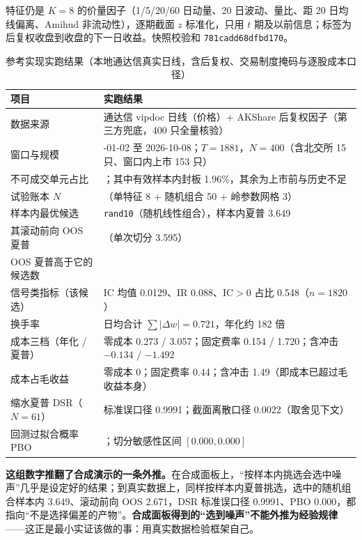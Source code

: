 特征仍是 $K=8$ 的价量因子（1/5/20/60 日动量、20 日波动、量比、距 20 日均线偏离、Amihud 非流动性），逐期截面 $z$ 标准化，只用 $t$ 期及以前信息；标签为后复权收盘到收盘的下一日收益。快照校验和 \texttt{781cadd68dfbd170}。

\begin{table}[htbp]
\centering
\caption{参考实现实跑结果（本地通达信真实日线，含后复权、交易制度掩码与逐股成本口径）}
\label{tab:runreal}
\begin{tabular}{@{}>{\raggedright\arraybackslash}p{5.6cm}>{\raggedright\arraybackslash}p{8.8cm}@{}}
\toprule
项目 & 实跑结果 \\
\midrule
数据来源 & 通达信 vipdoc 日线（价格）+ AKShare 后复权因子（第三方兜底，400 只全量核验） \\
窗口与规模 & 2019-01-02 至 2026-10-08；$T=1881$，$N=400$（含北交所 15 只、窗口内上市 153 只） \\
不可成交单元占比 & 0.2134；其中有效样本内封板 1.96\%，其余为上市前与历史不足 \\
试验账本 $N$ & 61（单特征 8 + 随机组合 50 + 岭参数网格 3） \\
样本内最优候选 & \texttt{rand10}（随机线性组合），样本内夏普 3.649 \\
其滚动前向 OOS 夏普 & 2.671（单次切分 3.595） \\
OOS 夏普高于它的候选数 & 1 \\
信号类指标（该候选） & IC 均值 0.0129、IR 0.088、IC$>$0 占比 0.548（$n=1820$） \\
换手率 & 日均合计 $\sum|\Delta w|=0.721$，年化约 182 倍 \\
成本三档（年化 / 夏普） & 零成本 0.273 / 3.057；固定费率 0.154 / 1.720；含冲击 $-0.134$ / $-1.492$ \\
成本占毛收益 & 零成本 0；固定费率 0.44；含冲击 1.49（即成本已超过毛收益本身） \\
缩水夏普 DSR（$N=61$） & 标准误口径 0.9991；截面离散口径 0.0022（取舍见下文） \\
回测过拟合概率 PBO & 0.000；切分敏感性区间 $[0.000, 0.000]$ \\
\bottomrule
\end{tabular}
\end{table}

\textbf{这组数字推翻了合成演示的一条外推。}在合成面板上，“按样本内挑选会选中噪声”几乎是设定好的结果；到真实数据上，同样按样本内夏普挑选，选中的随机组合样本内 3.649、滚动前向 OOS 2.671，DSR 标准误口径 0.9991、PBO 0.000，都指向“不是选择偏差的产物”。\textbf{合成面板得到的“选到噪声”不能外推为经验规律}——这正是最小实证该做的事：用真实数据检验框架自己。

